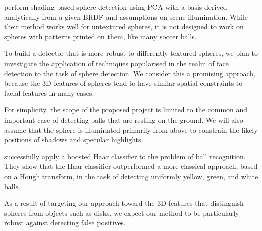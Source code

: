 \documentclass[11pt]{scrartcl}
\begin{document}
{        \citet{nillius2008shading} perform shading based sphere detection
        using PCA with a basis derived analytically from a given BRDF and assumptions
        on scene illumination. While their method works well for untextured spheres, it is
        not designed to work on spheres with patterns printed on them, like many
        soccer balls.

        To build a detector that is more robust to differently textured
        spheres, we plan to investigate the application of techniques
        popularised in the realm of face detection to the task of sphere
        detection. We consider this a promising approach, because the 3D
        features of spheres tend to have similar spatial constraints to facial
        features in many cases.

        For simplicity, the scope of the proposed project is limited to the
        common and important case of detecting balls that are resting on the
        ground. We will also assume that the sphere is illuminated primarily
        from above to constrain the likely positions of shadows and specular
        highlights.

        \citet{masselli2013haar} successfully apply a boosted Haar classifier
        \citep{viola2001robust} to the problem of ball recognition. They show
        that the Haar classifier outperformed a more classical approach, based on a
        Hough transform, in the task of detecting uniformly yellow, green, and white
        balls.




        As a result of targeting our approach toward the 3D features that
        distinguish spheres from objects such as disks, we expect our method
        to be particularly robust against detecting false positives.
	}
\end{document}
